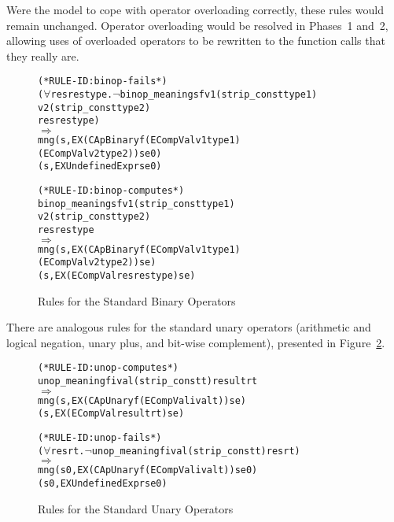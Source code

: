 \documentclass[11pt]{article}
\begin{document}
Were the model to cope with operator overloading correctly, these
rules would remain unchanged.  Operator overloading would be resolved
in Phases~1 and~2, allowing uses of overloaded operators to be
rewritten to the function calls that they really are.
\begin{figure}[htbp]
%
%
%
\begin{alltt}
(* RULE-ID: binop-fails *)
     (\(\forall\)res restype. \(\neg\)binop_meaning s f \(\!\)v1 (strip_const type1)
                                       v2 (strip_const type2)
                                       res restype)
   \(\Rightarrow\)
     mng (s, EX (CApBinary f (ECompVal v1 type1)
                             (ECompVal v2 type2)) se0)
         (s, EX UndefinedExpr se0)
\end{alltt}

\begin{alltt}
(* RULE-ID: binop-computes *)
     binop_meaning s f v1 (strip_const type1)
                       v2 (strip_const type2)
                       res restype
   \(\Rightarrow\)
     mng (s, EX (CApBinary f (ECompVal v1 type1)
                             (ECompVal v2 type2)) se)
         (s, EX (ECompVal res restype) se)
\end{alltt}
\caption{Rules for the Standard Binary Operators}
\label{fig:capbinary-rules}
\end{figure}

There are analogous rules for the standard unary operators (arithmetic
and logical negation, unary plus, and bit-wise complement), presented
in Figure~\ref{fig:capunary-rules}.
\begin{figure}[htbp]
%
%
%
\begin{alltt}
(* RULE-ID: unop-computes *)
     unop_meaning f ival (strip_const t) result rt
   \(\Rightarrow\)
     mng (s, EX (CApUnary f (ECompVal ival t)) se)
         (s, EX (ECompVal result rt) se)
\end{alltt}

\begin{alltt}
(* RULE-ID: unop-fails *)
     (\(\forall\)res rt. \(\neg\)unop_meaning f ival (strip_const t) res rt)
   \(\Rightarrow\)
     mng (s0, EX (CApUnary f (ECompVal ival t)) se0)
         (s0, EX UndefinedExpr se0)
\end{alltt}
\caption{Rules for the Standard Unary Operators}
\label{fig:capunary-rules}
\end{figure}
\end{document}
